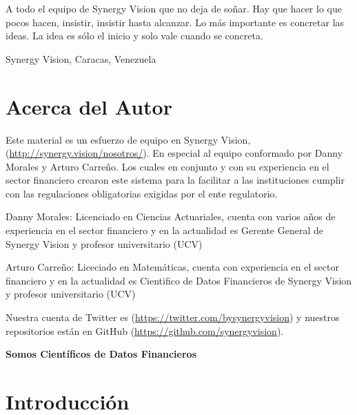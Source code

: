\documentclass[
  12pt,
]{krantz}
\theoremstyle{definition}
\theoremstyle{definition}
\theoremstyle{definition}
\theoremstyle{remark}
\let\BeginKnitrBlock\begin \let\EndKnitrBlock\end
\begin{document}
A todo el equipo de Synergy Vision que no deja de soñar. Hay que hacer lo que pocos hacen, insistir, insistir hasta alcanzar. Lo más importante es concretar las ideas. La idea es sólo el inicio y solo vale cuando se concreta.

\BeginKnitrBlock{flushright}
Synergy Vision, Caracas, Venezuela
\EndKnitrBlock{flushright}

\hypertarget{acerca-del-autor}{%
\chapter*{Acerca del Autor}\label{acerca-del-autor}}


Este material es un esfuerzo de equipo en Synergy Vision, (\url{http://synergy.vision/nosotros/}). En especial al equipo conformado por Danny Morales y Arturo Carreño. Los cuales en conjunto y con su experiencia en el sector financiero crearon este sistema para la facilitar a las instituciones cumplir con las regulaciones obligatorias exigidas por el ente regulatorio.

Danny Morales: Licenciado en Ciencias Actuariales, cuenta con varios años de experiencia en el sector financiero y en la actualidad es Gerente General de Synergy Vision y profesor universitario (UCV)

Arturo Carreño: Liceciado en Matemáticas, cuenta con experiencia en el sector financiero y en la actualidad es Cientifico de Datos Financieros de Synergy Vision y profesor universitario (UCV)

Nuestra cuenta de Twitter es (\url{https://twitter.com/bysynergyvision}) y nuestros repositorios están en GitHub (\url{https://github.com/synergyvision}).

\textbf{Somos Científicos de Datos Financieros}

\mainmatter

\hypertarget{introduccion}{%
\chapter{Introducción}\label{introduccion}}
\end{document}
